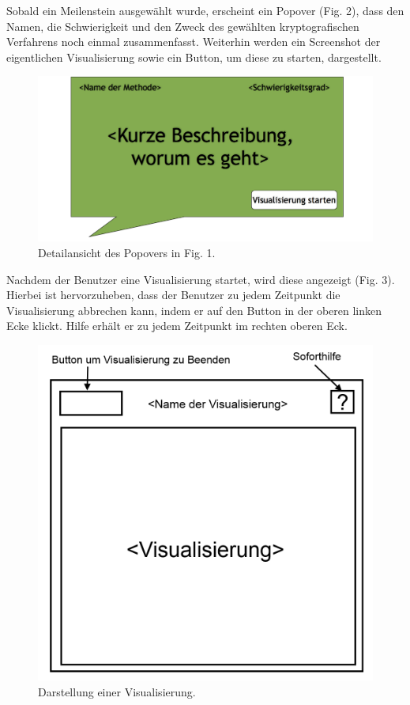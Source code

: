 \documentclass{article}
\begin{document}
Sobald ein Meilenstein ausgewählt wurde, erscheint ein Popover (Fig. 2), dass den Namen, die Schwierigkeit und den Zweck des gewählten kryptografischen Verfahrens noch einmal zusammenfasst. Weiterhin werden ein Screenshot der eigentlichen Visualisierung sowie ein Button, um diese zu starten, dargestellt.

\begin{figure}[H]
  \centering
    \includegraphics[width=\textwidth]{resources/ui_walkthrough_popover-draft}
  \caption{Detailansicht des Popovers in Fig. 1.}
\end{figure}

Nachdem der Benutzer eine Visualisierung startet, wird diese angezeigt (Fig. 3). Hierbei ist hervorzuheben, dass der Benutzer zu jedem Zeitpunkt die Visualisierung abbrechen kann, indem er auf den Button in der oberen linken Ecke klickt. Hilfe erhält er zu jedem Zeitpunkt im rechten oberen Eck.

\begin{figure}[H]
  \centering
    \includegraphics[width=\textwidth]{resources/ui_walkthrough_visualisation-draft}
  \caption{Darstellung einer Visualisierung.}
\end{figure}
\end{document}
